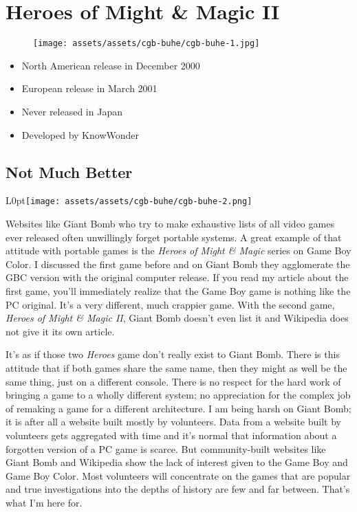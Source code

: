 \documentclass{book}
\begin{document}
\chapter*{Heroes of Might \& Magic II}
\vspace{\baselineskip}\begin{figure}[H]{\texttt{[image: assets/assets/cgb-buhe/cgb-buhe-1.jpg]}}\end{figure}\vspace{\baselineskip}
\begin{itemize}[left=0pt, nosep]
\item North American release in December 2000
\item European release in March 2001
\item Never released in Japan
\item Developed by KnowWonder

\end{itemize}
\newpage\FloatBarrier\section*{Not Much Better}
\begin{wrapfigure}{L}{0pt}{\texttt{[image: assets/assets/cgb-buhe/cgb-buhe-2.png]}}\end{wrapfigure}\noindent
Websites like Giant Bomb who try to make exhaustive lists of all video games ever released often unwillingly forget portable systems. A great example of that attitude with portable games is the \emph{Heroes of Might \& Magic} series on Game Boy Color. I discussed the first game before and on Giant Bomb they agglomerate the GBC version with the original computer release. If you read my article about the first game, you’ll immediately realize that the Game Boy game is nothing like the PC original. It’s a very different, much crappier game. With the second game, \emph{Heroes of Might \& Magic II}, Giant Bomb doesn’t even list it and Wikipedia does not give it its own article.\par
It’s as if those two \emph{Heroes} game don’t really exist to Giant Bomb. There is this attitude that if both games share the same name, then they might as well be the same thing, just on a different console. There is no respect for the hard work of bringing a game to a wholly different system; no appreciation for the complex job of remaking a game for a different architecture. I am being harsh on Giant Bomb; it is after all a website built mostly by volunteers. Data from a website built by volunteers gets aggregated with time and it’s normal that information about a forgotten version of a PC game is scarce. But community-built websites like Giant Bomb and Wikipedia show the lack of interest given to the Game Boy and Game Boy Color. Most volunteers will concentrate on the games that are popular and true investigations into the depths of history are few and far between. That’s what I’m here for.\par
\end{document}
